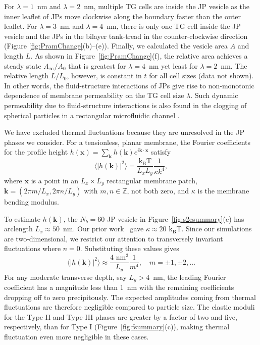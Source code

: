 \documentclass[prb,preprint,showpacs,preprintnumbers,amsmath,amssymb,longbibliography]{revtex4-2}
\newcommand{\kk}{\mathbf{k}}
\newcommand{\xx}{\mathbf{x}}
\newcommand{\kbt}{\mathrm{k}_{\text{B}}\mathrm{T}}
\begin{document}
For $\lambda=1$~nm and $\lambda=2$~nm, multiple TG cells are inside the
JP vesicle as the inner leaflet of JPs move clockwise along the boundary
faster than the outer leaflet. For $\lambda=3$~nm and $\lambda=4$~nm,
there is only one TG cell inside the JP vesicle and the JPs in the
bilayer tank-tread in the counter-clockwise direction (Figure
\ref{fig:PramChange}(b)--(e)). 
%
Finally, we calculated the vesicle area $A$ and length $L$. As shown in
Figure~\ref{fig:PramChange}(f), the relative area achieves a
steady state $A_{\infty}/A_0$ that is greatest for $\lambda = 4$~nm yet least for
$\lambda = 2$~nm. The relative length $L/L_0$, however, is constant in
$t$ for all cell sizes (data not shown). 
In other words, the fluid-structure interactions of JPs give rise to 
non-monotonic dependence of membrane permeability on the TG cell size $\lambda$.
Such dynamic permeability due to fluid-structure interactions is also found in the clogging of
spherical particles in a rectangular microfluidic channel \cite{MooreEtAl2023_PRL}.

We have excluded thermal fluctuations because they are unresolved in the
JP phases we consider. For a tensionless, planar membrane, the Fourier
coefficients for the profile height $h(\xx) = \sum_{\kk} h(\kk)e^{i \kk
\cdot \xx}$ satisfy~\cite{Merath2006FluctuationSO}
\begin{equation}
\label{eq:fourier_spectrum}
\langle |h(\kk)|^2 \rangle = \frac{\kbt}{L_xL_y}\frac{1}{\kappa k^4},
\end{equation}
where $\xx$ is a point in an $L_x \times L_y$ rectangular membrane
patch, $\kk = \left(2\pi m/L_x, 2\pi n/L_y\right)$ with $m,n \in
\mathbb{Z}$, not both zero, and $\kappa$ is the membrane bending
modulus.

To estimate $h(\kk)$, the $N_b = 60$ JP vesicle in
Figure~\ref{fig:s2esummary}(e) has arclength $L_x \approx 50$~nm. Our
prior work~\cite{Fu20,Fu2022_JFM} gave $\kappa \approx 20$ $\kbt$. Since
our simulations are two-dimensional, we restrict our attention to
transversely invariant fluctuations where $n = 0$. Substituting these
values gives 
\begin{equation}
\label{eq:fourier_spectrum_upper}
\langle |h(\kk)|^2 \rangle \approx \frac{4 \text{ nm}^3}{L_y}\frac{1}{m^4}, \quad m = \pm 1, \pm 2, \dots
\end{equation}
For any moderate transverse depth, say $L_y > 4$~nm, the leading Fourier
coefficient has a magnitude less than $1$~nm with the remaining
coefficients dropping off to zero precipitously. The expected amplitudes
coming from thermal fluctuations are therefore negligible compared to
particle size. The elastic moduli for the Type II and Type III phases
are greater by a factor of two and five, respectively, than for Type I
(Figure~\ref{fig:fsummary}(c)), making thermal fluctuation even more
negligible in these cases.
\end{document}
